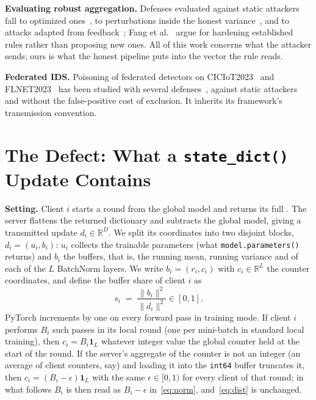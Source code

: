 \documentclass[journal]{IEEEtran}
\begin{document}
\textbf{Evaluating robust aggregation.} Defenses evaluated against static attackers fall to optimized
ones~\cite{shejwalkar2021,fang2020local}, to perturbations inside the honest
variance~\cite{baruch2019little}, and to attacks adapted from
feedback~\cite{li20233dfed,yang2024learning}; Fang et
al.~\cite{fang2025foundation} argue for hardening established rules rather than
proposing new ones. All of this work concerns
what the attacker sends; ours is what the honest pipeline puts into the vector
the rule reads.

\textbf{Federated IDS.} Poisoning of federated detectors on
CICIoT2023~\cite{neto2023ciciot} and FLNET2023~\cite{flnet2023} has been studied
with several defenses~\cite{zhang2022secfednids,merzouk2023param,sameera2025weidetect},
against static attackers and without the false-positive cost of exclusion. It inherits its framework's transmission convention.

\section{The Defect: What a \texttt{state\_dict()} Update Contains}
\label{sec:defect}

\textbf{Setting.} Client $i$ starts a round from the global model and returns its
full \sd{}. The server flattens the returned dictionary and subtracts the global
model, giving a transmitted update $d_i\in\mathbb{R}^{D}$. We split its
coordinates into two disjoint blocks, $d_i=(u_i,b_i)$: $u_i$ collects the trainable
parameters (what \texttt{model.parameters()} returns) and $b_i$ the buffers, that
is, the running mean, running variance and \nbt{} of each of the $L$ BatchNorm
layers. We write $b_i=(r_i,c_i)$ with $c_i\in\mathbb{R}^{L}$ the counter
coordinates, and define the buffer share of client $i$ as
\begin{equation}
\label{eq:share}
s_i \;=\; \frac{\|b_i\|^2}{\|d_i\|^2}\in[0,1].
\end{equation}
PyTorch increments \nbt{} by one on every forward pass in training mode. If
client $i$ performs $B_i$ such passes in its local round (one per mini-batch in
standard local training), then $c_i=B_i\mathbf{1}_L$ whatever integer value the
global counter held at the start of the round. If the server's aggregate of the
counter is not an integer (an average of client counters, say) and loading it
into the \texttt{int64} buffer truncates it, then $c_i=(B_i-\epsilon)\mathbf{1}_L$
with the same $\epsilon\in[0,1)$ for every client of that round; in what follows
$B_i$ is then read as $B_i-\epsilon$ in~\eqref{eq:norm}, and~\eqref{eq:dist} is
unchanged.
\end{document}
